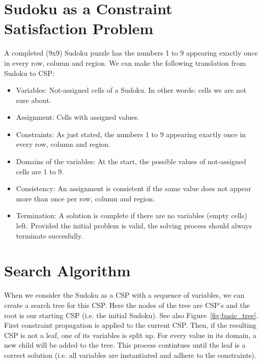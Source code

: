 \documentclass[11pt]{article} %
\begin{document}
\section{Sudoku as a Constraint Satisfaction Problem}

A completed (9x9) Sudoku puzzle has the numbers 1 to 9 appearing exactly once in every row, column and region. We can make the following translation from Sudoku to CSP:
\begin{itemize}
\item Variables: Not-assigned cells of a Sudoku. In other words: cells we are not sure about.
\item Assignment: Cells with assigned values.
\item Constraints: As just stated,  the numbers 1 to 9 appearing exactly once in every row, column and region.
\item Domains of the variables: At the start, the possible values of not-assigned cells are 1 to 9.
\item Consistency: An assignment is consistent if the same value does not appear more than once per row, column and region.
\item Termination: A solution is complete if there are no variables (empty cells) left. Provided the initial problem is valid, the solving process should always terminate succesfully.
\end{itemize}

\section{Search Algorithm}

When we consider the Sudoku as a CSP with a sequence of variables, we can create a search tree for this CSP. Here the nodes of the tree are CSP's and the root is our starting CSP (i.e. the initial Sudoku). See also Figure~\ref{fig:basic_tree}. First constraint propagation is applied to the current CSP. Then, if the resulting CSP is not a leaf, one of its variables is split up. For every value in its domain, a new child will be added to the tree. This process contintues until the leaf is a correct solution (i.e. all variables are instantiated and adhere to the constraints).
\end{document}
